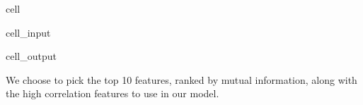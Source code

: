 \documentclass[letterpaper,10pt,english]{jupyterBook}
\begin{document}
\begin{sphinxuseclass}{cell}\begin{sphinxVerbatimInput}

\begin{sphinxuseclass}{cell_input}
\begin{sphinxVerbatim}[commandchars=\\\{\}]
  \PYG{p}{[}\PYG{p}{]}
\end{sphinxVerbatim}

\end{sphinxuseclass}\end{sphinxVerbatimInput}
\begin{sphinxVerbatimOutput}

\begin{sphinxuseclass}{cell_output}
\begin{sphinxVerbatim}
\end{sphinxVerbatim}

\end{sphinxuseclass}\end{sphinxVerbatimOutput}

\end{sphinxuseclass}
\sphinxAtStartPar
We choose to pick the top 10 features, ranked by mutual information, along with the high correlation features to use in our model.
\end{document}
